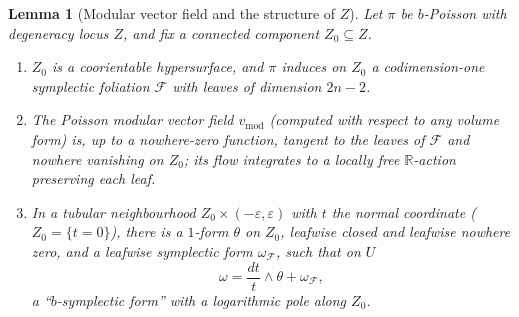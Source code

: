 \documentclass{amsart}
\newtheorem{lemma}{Lemma}
\theoremstyle{definition}
\begin{document}
\begin{lemma}[Modular vector field and the structure of $Z$]\label{lem:Z}
Let $\pi$ be $b$-Poisson with degeneracy locus $Z$, and fix a connected
component $Z_0\subseteq Z$.
\begin{enumerate}
\item $Z_0$ is a coorientable hypersurface, and $\pi$ induces on $Z_0$ a
codimension-one symplectic foliation $\mathcal F$ with leaves of dimension
$2n-2$.
\item The Poisson \emph{modular vector field} $v_{\mathrm{mod}}$ (computed with
respect to any volume form) is, up to a nowhere-zero function, tangent to the
leaves of $\mathcal F$ and nowhere vanishing on $Z_0$; its flow integrates to a
locally free $\mathbb R$-action preserving each leaf.
\item In a tubular neighbourhood $Z_0\times(-\varepsilon,\varepsilon)$ with $t$
the normal coordinate ($Z_0=\{t=0\}$), there is a $1$-form $\theta$ on $Z_0$,
leafwise closed and leafwise nowhere zero, and a leafwise symplectic form
$\omega_{\mathcal F}$, such that on $U$
\begin{equation}\label{eq:bnf}
\omega=\frac{dt}{t}\wedge\theta+\omega_{\mathcal F},
\end{equation}
a ``$b$-symplectic form'' with a logarithmic pole along $Z_0$.
\end{enumerate}
\end{lemma}
\end{document}
